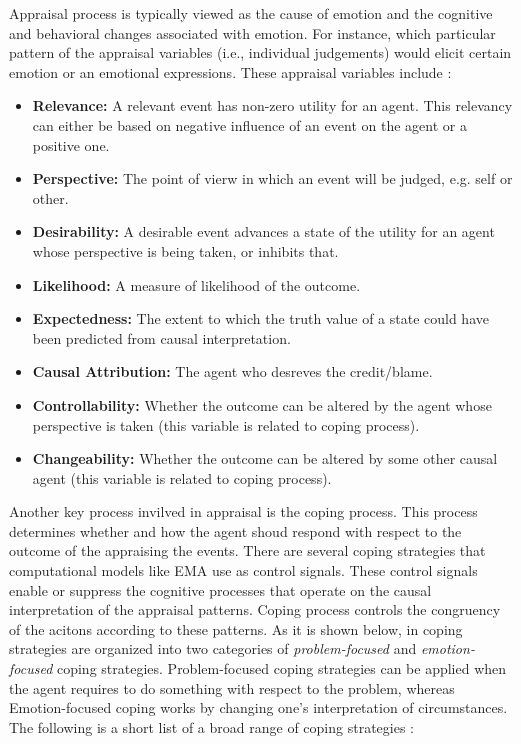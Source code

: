 \documentclass[11pt]{article}
\begin{document}
Appraisal process is typically viewed as the cause of emotion and the cognitive
and behavioral changes associated with emotion. For instance, which particular
pattern of the appraisal variables (i.e., individual judgements) would elicit
certain emotion or an emotional expressions. These appraisal variables
include \cite{marsella:ema-process-model}:\\

\begin{itemize}
  \item \textbf{Relevance:} A relevant event has non-zero utility for an agent.
  This relevancy can either be based on negative influence of an event on the
  agent or a positive one.
  
  \item \textbf{Perspective:} The point of vierw in which an event will be
  judged, e.g. self or other.
  
  \item \textbf{Desirability:} A desirable event advances a state of the utility
  for an agent whose perspective is being taken, or inhibits that.
  
  \item \textbf{Likelihood:} A measure of likelihood of the outcome.
  
  \item \textbf{Expectedness:} The extent to which the truth value of a state
  could have been predicted from causal interpretation.
  
  \item \textbf{Causal Attribution:} The agent who desreves the credit/blame.
  
  \item \textbf{Controllability:} Whether the outcome can be altered by the
  agent whose perspective is taken (this variable is related to coping process).
  
  \item \textbf{Changeability:} Whether the outcome can be altered by some other
  causal agent (this variable is related to coping process).
\end{itemize}

Another key process invilved in appraisal is the coping process. This process
determines whether and how the agent shoud respond with respect to the outcome
of the appraising the events. There are several coping strategies that
computational models like EMA \cite{gratch:domain-independent} use as control
signals. These control signals enable or suppress the cognitive processes that
operate on the causal interpretation of the appraisal patterns. Coping process
controls the congruency of the acitons according to these patterns. As it is
shown below, in \cite{gratch:domain-independent} coping strategies are organized
into two categories of \textit{problem-focused} and \textit{emotion-focused}
coping strategies. Problem-focused coping strategies can be applied when the
agent requires to do something with respect to the problem, whereas
Emotion-focused coping works by changing one's interpretation of circumstances.
The following is a short list of a broad range of coping strategies
\cite{gratch:domain-independent}:
\end{document}
